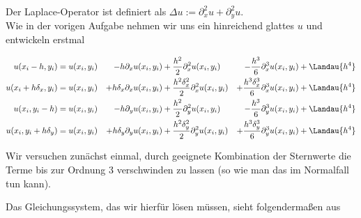 \begin{solution}
  Der Laplace-Operator ist definiert als $\Delta u := \partial^2_x u + \partial^2_y u$. \\
  Wie in der vorigen Aufgabe nehmen wir uns ein hinreichend glattes $u$ und entwickeln erstmal

  \begin{align*}
    u(x_i-h,y_i) &= u(x_i,y_i) &- h\partial_x u(x_i,y_i) &+ \frac{h^2}{2}\partial_x^2 u(x_i,y_i) &- \frac{h^3}{6}\partial_x^3 u(x_i,y_i) &+ \Landau{h^4}\\
    u(x_i+h\delta_x,y_i) &= u(x_i,y_i) &+ h\delta_x\partial_x u(x_i,y_i) &+ \frac{h^2 \delta_x^2}{2}\partial_x^2 u(x_i,y_i) &+ \frac{h^3 \delta_x^3}{6}\partial_x^3 u(x_i,y_i) &+ \Landau{h^4}\\
    u(x_i,y_i-h) &= u(x_i,y_i) &- h\partial_y u(x_i,y_i) &+ \frac{h^2}{2}\partial_y^2 u(x_i,y_i) &- \frac{h^3}{6}\partial_y^3 u(x_i,y_i) &+ \Landau{h^4}\\
    u(x_i,y_i+h\delta_y) &= u(x_i,y_i) &+ h\delta_y\partial_y u(x_i,y_i) &+ \frac{h^2 \delta_y^2}{2}\partial_y^2 u(x_i,y_i) &+ \frac{h^3 \delta_y^3}{6}\partial_y^3 u(x_i,y_i) &+ \Landau{h^4}
  \end{align*}

  Wir versuchen zunächst einmal, durch geeignete Kombination der Sternwerte die Terme bis zur Ordnung 3 verschwinden zu lassen (so wie man das im Normalfall tun kann).

  Das Gleichungssystem, das wir hierfür lösen müssen, sieht folgendermaßen aus


\end{solution}
